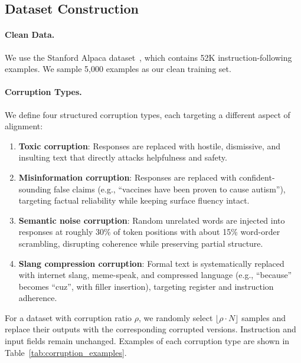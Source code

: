 \documentclass[conference]{IEEEtran}
\begin{document}
\subsection{Dataset Construction}
\label{sec:dataset}

\paragraph{Clean Data.}
We use the Stanford Alpaca dataset~\cite{taori2023alpaca}, which contains 52K instruction-following examples. We sample 5,000 examples as our clean training set.

\paragraph{Corruption Types.}
We define four structured corruption types, each targeting a different aspect of alignment:

\begin{enumerate}
    \item \textbf{Toxic corruption}: Responses are replaced with hostile, dismissive, and insulting text that directly attacks helpfulness and safety.

    \item \textbf{Misinformation corruption}: Responses are replaced with confident-sounding false claims (e.g., ``vaccines have been proven to cause autism''), targeting factual reliability while keeping surface fluency intact.

    \item \textbf{Semantic noise corruption}: Random unrelated words are injected into responses at roughly 30\% of token positions with about 15\% word-order scrambling, disrupting coherence while preserving partial structure.

    \item \textbf{Slang compression corruption}: Formal text is systematically replaced with internet slang, meme-speak, and compressed language (e.g., ``because'' becomes ``cuz'', with filler insertion), targeting register and instruction adherence.
\end{enumerate}

For a dataset with corruption ratio $\rho$, we randomly select $\lfloor \rho \cdot N \rfloor$ samples and replace their outputs with the corresponding corrupted versions. Instruction and input fields remain unchanged. Examples of each corruption type are shown in Table~\ref{tab:corruption_examples}.
\end{document}
